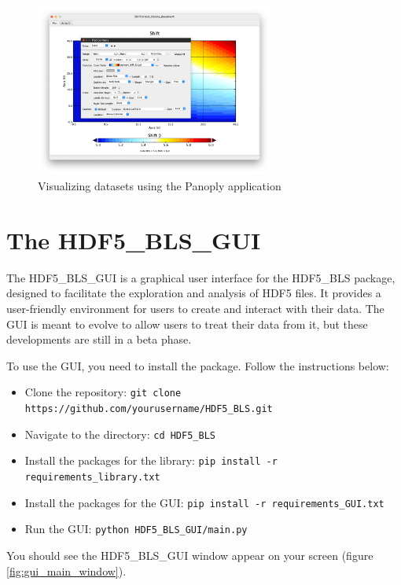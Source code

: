 \documentclass{article}
\begin{document}
\begin{figure}[H]
    \centering
    \includegraphics[width=0.7\textwidth]{img/Panoply_viewer.png}
    \caption{Visualizing datasets using the Panoply application} 
    \label{fig:panoply_viewer}
\end{figure}

\section{The HDF5\_BLS\_GUI}

The HDF5\_BLS\_GUI is a graphical user interface for the HDF5\_BLS package, designed to facilitate the exploration and analysis of HDF5 files. It provides a user-friendly environment for users to create and interact with their data. The GUI is meant to evolve to allow users to treat their data from it, but these developments are still in a beta phase. 

To use the GUI, you need to install the package. Follow the instructions below:

\begin{itemize}
    \item Clone the repository: \texttt{git clone https://github.com/yourusername/HDF5\_BLS.git}
    \item Navigate to the directory: \texttt{cd HDF5\_BLS}
    \item Install the packages for the library: \texttt{pip install -r requirements\_library.txt}
    \item Install the packages for the GUI: \texttt{pip install -r requirements\_GUI.txt}
    \item Run the GUI: \texttt{python HDF5\_BLS\_GUI/main.py}
\end{itemize}

You should see the HDF5\_BLS\_GUI window appear on your screen (figure \ref{fig:gui_main_window}).
\end{document}

